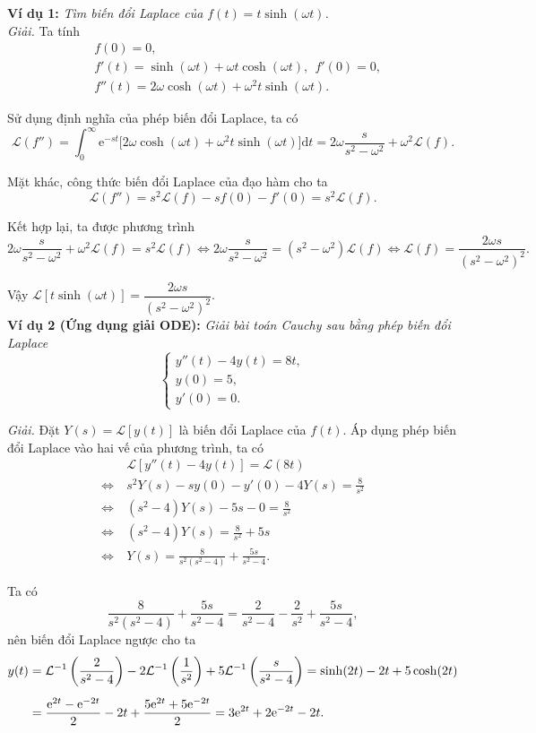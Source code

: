 \documentclass[10pt, a4paper]{article}
\begin{document}
	\textbf{Ví dụ 1:} \textit{Tìm biến đổi Laplace của $f(t)=t\sinh(\omega t)$.}\\
	
	\textit{Giải.} Ta tính \begin{align*}
		&f(0)=0,\\
		&f'(t)=\sinh(\omega t)+\omega t\cosh(\omega t),~~f'(0)=0,\\
		&f''(t)=2\omega\cosh(\omega t)+\omega^2t\sinh(\omega t).
	\end{align*}
	
	Sử dụng định nghĩa của phép biến đổi Laplace, ta có $$\mathcal L(f'')=\int_0^\infty\mathrm e^{-st}\big[2\omega\cosh(\omega t)+\omega^2t\sinh(\omega t)\big]\mathrm dt=2\omega\frac{s}{s^2-\omega^2}+\omega^2\mathcal L(f).$$
	
	Mặt khác, công thức biến đổi Laplace của đạo hàm cho ta $$\mathcal L(f'')=s^2\mathcal L(f)-sf(0)-f'(0)=s^2\mathcal L(f).$$
	
	Kết hợp lại, ta được phương trình $$2\omega\frac{s}{s^2-\omega^2}+\omega^2\mathcal L(f)=s^2\mathcal L(f)\iff2\omega\frac{s}{s^2-\omega^2}=(s^2-\omega^2)\mathcal L(f)\iff\mathcal L(f)=\frac{2\omega s}{(s^2-\omega^2)^2}.$$
	
	Vậy $\mathcal L[t\sinh(\omega t)]=\dfrac{2\omega s}{(s^2-\omega^2)^2}$.\\
	
	\textbf{Ví dụ 2 (Ứng dụng giải ODE):} \textit{Giải bài toán Cauchy sau bằng phép biến đổi Laplace} $$\begin{cases}
		y''(t)-4y(t)=8t,\\
		y(0)=5,\\
		y'(0)=0.
	\end{cases}$$
	
	\textit{Giải.} Đặt $Y(s)=\mathcal L[y(t)]$ là biến đổi Laplace của $f(t)$. Áp dụng phép biến đổi Laplace vào hai vế của phương trình, ta có \begin{align*}
		&\mathcal L[y''(t)-4y(t)]=\mathcal L(8t)\\
		\Leftrightarrow~&s^2Y(s)-sy(0)-y'(0)-4Y(s)=\frac{8}{s^2}\\
		\Leftrightarrow~&(s^2-4)Y(s)-5s-0=\frac{8}{s^2}\\
		\Leftrightarrow~&(s^2-4)Y(s)=\frac{8}{s^2}+5s\\
		\Leftrightarrow~&Y(s)=\frac{8}{s^2(s^2-4)}+\frac{5s}{s^2-4}.
	\end{align*}
	
	Ta có $$\frac{8}{s^2(s^2-4)}+\frac{5s}{s^2-4}=\frac{2}{s^2-4}-\frac{2}{s^2}+\frac{5s}{s^2-4},$$
	nên biến đổi Laplace ngược cho ta \begin{align*}
		y(t)&=\mathcal L^{-1}\left(\frac{2}{s^2-4}\right)-2\mathcal L^{-1}\left(\frac{1}{s^2}\right)+5\mathcal L^{-1}\left(\frac{s}{s^2-4}\right)=\sinh(2t)-2t+5\cosh(2t)\\
		\noalign{\vskip5pt}
		&=\frac{\mathrm e^{2t}-\mathrm e^{-2t}}{2}-2t+\frac{5\mathrm e^{2t}+5\mathrm e^{-2t}}{2}=3\mathrm e^{2t}+2\mathrm e^{-2t}-2t.
	\end{align*}
\end{document}
